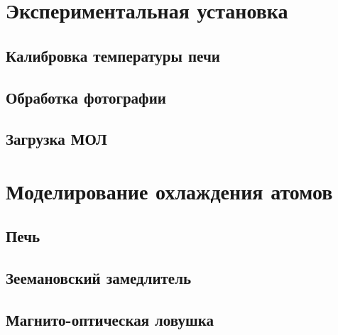 \unewpage
\section{Экспериментальная установка}


\unewpage
\subsection{Калибровка температуры печи}



\unewpage
\subsection{Обработка фотографии}


\unewpage
\subsection{Загрузка МОЛ}







\unewpage
\section{Моделирование охлаждения атомов}


\subsection{Печь}



\unewpage
\subsection{Зеемановский замедлитель} 



% 


\unewpage
\subsection{Магнито-оптическая ловушка} \label{subsec:мол}




